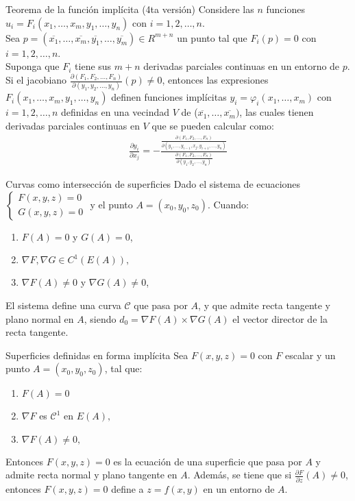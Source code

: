 \documentclass[a4paper, twoside]{article}
\numberwithin{equation}{section}
\numberwithin{figure}{section}
\numberwithin{table}{section}
\begin{document}
\begin{teorema*}{Teorema de la función implícita (4ta versión)}
	Considere las $n$ funciones $u_i=F_i(x_1,\ldots,x_m,y_1,\ldots,y_n)$ con $i=1,2,\ldots,n$.\\
	
	Sea $p=(\overline{x_1},\ldots,\overline{x_m},\overline{y_1},\ldots,\overline{y_m}) \in R^{m+n}$ un punto tal que $F_i(p)=0$ con $i=1,2,\ldots,n$.\\
	
	Suponga que $F_i$ tiene sus $m+n$ derivadas parciales continuas en un entorno de $p$.\\
	
	Si el jacobiano $\frac{\partial(F_1,F_2,\ldots,F_n)}{\partial(y_1,y_2,\ldots,y_n)}(p)\ne0$, entonces las expresiones $F_i(x_1,\ldots,x_m,y_1,\ldots,y_n)$ definen funciones implícitas $y_i=\varphi_i(x_1,\ldots,x_m)$ con $i=1,2,\ldots,n$ definidas en una vecindad $V$ de ($\overline{x_1},\ldots,\overline{x_m})$, las cuales tienen derivadas parciales continuas en $V$ que se pueden calcular como:
	\begin{align}
		\frac{\partial y_i}{\partial x_j}=-\frac{\frac{\partial(F_1,F_2,\ldots,F_n)}{\partial(y_1,\ldots,y_{i-1},x_j,y_{i+1},\ldots,y_n)}}{\frac{\partial(F_1,F_2,\ldots,F_n)}{\partial(y_1,y_2,\ldots,y_n)}}
	\end{align}
\end{teorema*}

\begin{definicion*}{Curvas como intersección de superficies}
	Dado el sistema de ecuaciones $\left\{ \begin{array}{c} F\left(x,y,z\right)=0 \\ G\left(x,y,z\right)=0\end{array}\right.$ y el punto $A=(x_0,y_0,z_0)$. Cuando:
	\begin{enumerate}
		\item $F(A)=0$ y $G(A)=0$,
		\item $\nabla F,\nabla G\in C^{1}(E(A)),$
		\item $\nabla F(A)\neq0$ y $\nabla G(A)\ne0$,
	\end{enumerate}
	El sistema define una curva $\mathcal{C}$ que pasa por $A$, y que admite recta tangente y plano normal en $A$, siendo $d_0=\nabla F(A)\times\nabla G(A)$ el vector director de la recta tangente.
\end{definicion*}

\begin{definicion*}{Superficies definidas en forma implícita}
	Sea $F(x,y,z)=0$ con $F$ escalar y un punto $A=(x_0,y_0,z_0)$, tal que:
	\begin{enumerate}
		\item $F(A)=0$
		\item $\nabla F$ es $\mathcal{C}^{1}$ en $E(A),$
		\item $\nabla F(A)\ne0,$
	\end{enumerate}
	Entonces $F(x,y,z)=0$ es la ecuación de una superficie que pasa por $A$ y admite recta normal y plano tangente en $A$. Además, se tiene que si $\frac{\partial F}{\partial z}(A)\ne0$, entonces $F(x,y,z)=0$ define a $z=f(x,y)$ en un entorno de $A$.
\end{definicion*}
\end{document}
